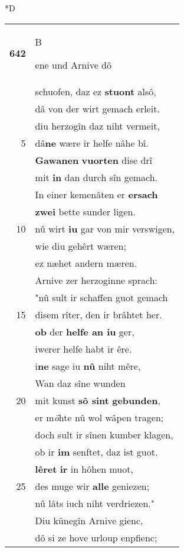 \documentclass[8pt,a4paper,notitlepage]{article}
\begin{document}
\begin{table}[ht]
\begin{minipage}[t]{0.5\linewidth}
\small
\begin{center}*D
\end{center}
\begin{tabular}{rl}
\textbf{642} & \begin{large}B\end{large}ene und Arnive dô\\ 
 & schuofen, daz ez \textbf{stuont} alsô,\\ 
 & dâ von der wirt gemach erleit.\\ 
 & diu herzogîn daz niht vermeit,\\ 
5 & dâ\textbf{ne} wære ir helfe nâhe bî.\\ 
 & \textbf{Gawanen} \textbf{vuorten} dise drî\\ 
 & mit \textbf{in} dan durch sîn gemach.\\ 
 & In einer kemenâten er \textbf{ersach}\\ 
 & \textbf{zwei} bette sunder ligen.\\ 
10 & nû wirt \textbf{iu} gar von mir verswigen,\\ 
 & wie diu gehêrt wæren;\\ 
 & ez næhet andern mæren.\\ 
 & Arnive zer herzoginne sprach:\\ 
 & "nû sult ir schaffen guot gemach\\ 
15 & disem rîter, den ir brâhtet her.\\ 
 & \textbf{ob} der \textbf{helfe an iu} ger,\\ 
 & iwerer helfe habt ir êre.\\ 
 & i\textbf{ne} sage iu \textbf{nû} niht mêre,\\ 
 & Wan daz sîne wunden\\ 
20 & mit kunst \textbf{sô sint} \textbf{gebunden},\\ 
 & er m\textit{ö}hte nû wol wâpen tragen;\\ 
 & doch sult ir sînen kumber klagen,\\ 
 & ob ir \textbf{im} senftet, daz ist guot.\\ 
 & \textbf{lêret} \textbf{ir} in hôhen muot,\\ 
25 & des muge wir \textbf{alle} geniezen;\\ 
 & nû lâts iuch niht verdriezen."\\ 
 & Diu künegîn Arnive gienc,\\ 
 & dô si ze hove urloup enpfienc;\\ 

\end{tabular}
\end{minipage}
\end{table}
\end{document}
